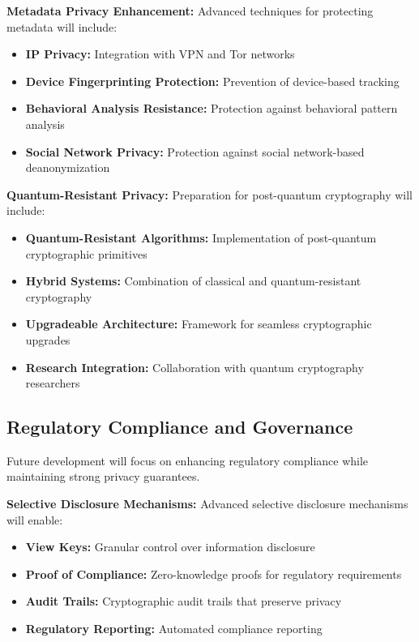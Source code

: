 \documentclass[11pt,a4paper]{article}
\begin{document}
\textbf{Metadata Privacy Enhancement:}
Advanced techniques for protecting metadata will include:
\begin{itemize}
    \item \textbf{IP Privacy:} Integration with VPN and Tor networks
    \item \textbf{Device Fingerprinting Protection:} Prevention of device-based tracking
    \item \textbf{Behavioral Analysis Resistance:} Protection against behavioral pattern analysis
    \item \textbf{Social Network Privacy:} Protection against social network-based deanonymization
\end{itemize}

\textbf{Quantum-Resistant Privacy:}
Preparation for post-quantum cryptography will include:
\begin{itemize}
    \item \textbf{Quantum-Resistant Algorithms:} Implementation of post-quantum cryptographic primitives
    \item \textbf{Hybrid Systems:} Combination of classical and quantum-resistant cryptography
    \item \textbf{Upgradeable Architecture:} Framework for seamless cryptographic upgrades
    \item \textbf{Research Integration:} Collaboration with quantum cryptography researchers
\end{itemize}

\subsection{Regulatory Compliance and Governance}

Future development will focus on enhancing regulatory compliance while maintaining strong privacy guarantees.

\textbf{Selective Disclosure Mechanisms:}
Advanced selective disclosure mechanisms will enable:
\begin{itemize}
    \item \textbf{View Keys:} Granular control over information disclosure
    \item \textbf{Proof of Compliance:} Zero-knowledge proofs for regulatory requirements
    \item \textbf{Audit Trails:} Cryptographic audit trails that preserve privacy
    \item \textbf{Regulatory Reporting:} Automated compliance reporting
\end{itemize}
\end{document}
